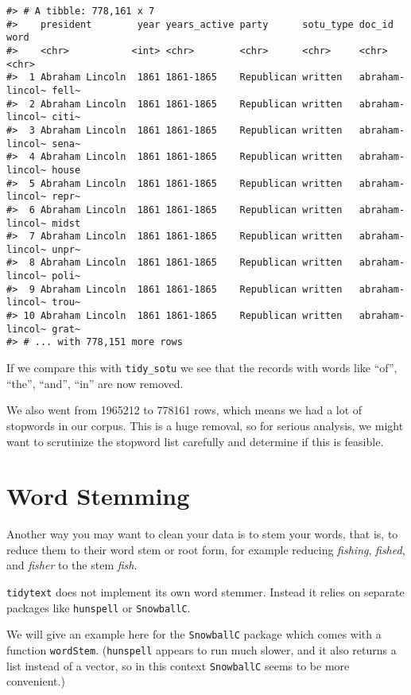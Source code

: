\documentclass[
]{book}
\begin{document}
\begin{verbatim}
#> # A tibble: 778,161 x 7
#>    president        year years_active party      sotu_type doc_id          word 
#>    <chr>           <int> <chr>        <chr>      <chr>     <chr>           <chr>
#>  1 Abraham Lincoln  1861 1861-1865    Republican written   abraham-lincol~ fell~
#>  2 Abraham Lincoln  1861 1861-1865    Republican written   abraham-lincol~ citi~
#>  3 Abraham Lincoln  1861 1861-1865    Republican written   abraham-lincol~ sena~
#>  4 Abraham Lincoln  1861 1861-1865    Republican written   abraham-lincol~ house
#>  5 Abraham Lincoln  1861 1861-1865    Republican written   abraham-lincol~ repr~
#>  6 Abraham Lincoln  1861 1861-1865    Republican written   abraham-lincol~ midst
#>  7 Abraham Lincoln  1861 1861-1865    Republican written   abraham-lincol~ unpr~
#>  8 Abraham Lincoln  1861 1861-1865    Republican written   abraham-lincol~ poli~
#>  9 Abraham Lincoln  1861 1861-1865    Republican written   abraham-lincol~ trou~
#> 10 Abraham Lincoln  1861 1861-1865    Republican written   abraham-lincol~ grat~
#> # ... with 778,151 more rows
\end{verbatim}

If we compare this with \texttt{tidy\_sotu} we see that the records with words like ``of'', ``the'', ``and'', ``in'' are now removed.

We also went from 1965212 to 778161 rows, which means we had a lot of stopwords in our corpus. This is a huge removal, so for serious analysis, we might want to scrutinize the stopword list carefully and determine if this is feasible.

\hypertarget{word-stemming}{%
\section{Word Stemming}\label{word-stemming}}

Another way you may want to clean your data is to stem your words, that is, to reduce them to their word stem or root form, for example reducing \emph{fishing}, \emph{fished}, and \emph{fisher} to the stem \emph{fish}.

\texttt{tidytext} does not implement its own word stemmer. Instead it relies on separate packages like \texttt{hunspell} or \texttt{SnowballC}.

We will give an example here for the \texttt{SnowballC} package which comes with a function \texttt{wordStem}. (\texttt{hunspell} appears to run much slower, and it also returns a list instead of a vector, so in this context \texttt{SnowballC} seems to be more convenient.)
\end{document}
